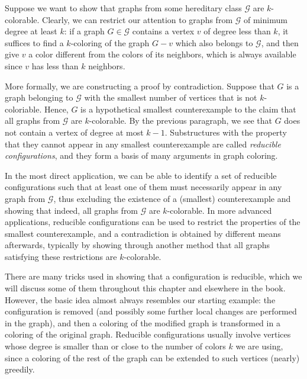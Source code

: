 \documentclass[12pt,twoside,openright,a4paper]{book}
\newcommand{\GG}{\mathcal{G}}
\begin{document}
Suppose we want to show that graphs from some hereditary class $\GG$ are $k$-colorable.  Clearly, we can
restrict our attention to graphs from $\GG$ of minimum degree at least $k$: if a graph $G\in \GG$
contains a vertex $v$ of degree less than $k$, it suffices to find a $k$-coloring of the graph $G-v$
which also belongs to $\GG$, and then give $v$ a color different from the colors of its neighbors,
which is always available since $v$ has less than $k$ neighbors.

More formally, we are constructing a proof by contradiction.  Suppose that $G$ is a graph belonging to $\GG$
with the smallest number of vertices that is not $k$-coloriable.  Hence, $G$ is a hypothetical smallest counterexample
to the claim that all graphs from $\GG$ are $k$-colorable.
By the previous paragraph, we see that $G$ does not contain a vertex of degree at most $k-1$.
Substructures with the property that they cannot appear in any smallest counterexample
are called \emph{reducible configurations}, and they form a basis of many arguments in graph coloring.

In the most direct application, we can be able to identify a set of reducible configurations such that
at least one of them must necessarily appear in any graph from $\GG$, thus excluding the existence of
a (smallest) counterexample and showing that indeed, all graphs from $\GG$ are $k$-colorable.
In more advanced applications, reducible configurations can be used to restrict the properties
of the smallest counterexample, and a contradiction is obtained by different means afterwards, typically
by showing through another method that all graphs satisfying these restrictions are $k$-colorable.

There are many tricks used in showing that a configuration is reducible, which we will discuss some
of them throughout this chapter and elsewhere in the book. However, the basic idea almost always resembles
our starting example: the configuration is removed (and possibly some further local changes are
performed in the graph), and then a coloring of the modified graph is transformed in a coloring of the
original graph.  Reducible configurations usually involve vertices whose degree is
smaller than or close to the number of colors $k$ we are using, since a coloring of the rest of the graph
can be extended to such vertices (nearly) greedily.
\end{document}
